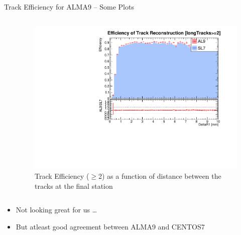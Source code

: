 \begin{frame}{Track Efficiency for ALMA9  -- Some Plots}
\begin{columns}
\begin{column}{0.5 \textwidth}
        \end{column}
        \begin{column}{0.5 \textwidth}
            \begin{figure}
                \centering
                \includegraphics[width=1.1\textwidth]{assets/NEffi_greq2_DeltaR1.pdf}
                \caption{Track Efficiency ($\geq$2) as a function of distance between the tracks at the final station}
            \end{figure}
        \end{column}
    \end{columns}
    \begin{itemize}
        \item Not looking great for us \ldots 
        \item But atleast good agreement between ALMA9 and CENTOS7
    \end{itemize}
\end{frame}
